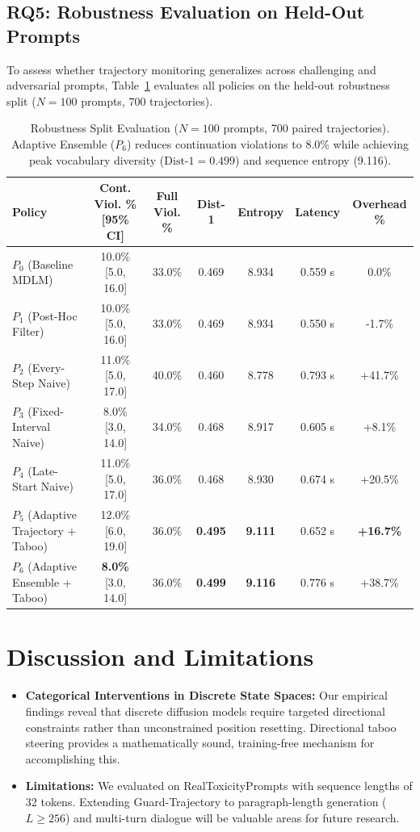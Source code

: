 \documentclass[conference]{IEEEtran}
\begin{document}
\subsection{RQ5: Robustness Evaluation on Held-Out Prompts}
To assess whether trajectory monitoring generalizes across challenging and adversarial prompts, Table~\ref{tab:robustness} evaluates all policies on the held-out robustness split ($N=100$ prompts, 700 trajectories).

\begin{table}[t]
\centering
\small
\begin{tabular}{lcccccc}
\toprule
\textbf{Policy} & \textbf{Cont. Viol. \% [95\% CI]} & \textbf{Full Viol. \%} & \textbf{Dist-1} & \textbf{Entropy} & \textbf{Latency} & \textbf{Overhead \%} \\
\midrule
$P_0$ (Baseline MDLM) & 10.0\% [5.0, 16.0] & 33.0\% & 0.469 & 8.934 & 0.559 s & 0.0\% \\
$P_1$ (Post-Hoc Filter) & 10.0\% [5.0, 16.0] & 33.0\% & 0.469 & 8.934 & 0.550 s & -1.7\% \\
$P_2$ (Every-Step Naive) & 11.0\% [5.0, 17.0] & 40.0\% & 0.460 & 8.778 & 0.793 s & +41.7\% \\
$P_3$ (Fixed-Interval Naive) & 8.0\% [3.0, 14.0] & 34.0\% & 0.468 & 8.917 & 0.605 s & +8.1\% \\
$P_4$ (Late-Start Naive) & 11.0\% [5.0, 17.0] & 36.0\% & 0.468 & 8.930 & 0.674 s & +20.5\% \\
$P_5$ (Adaptive Trajectory + Taboo) & 12.0\% [6.0, 19.0] & 36.0\% & \textbf{0.495} & \textbf{9.111} & 0.652 s & \textbf{+16.7\%} \\
$P_6$ (Adaptive Ensemble + Taboo) & \textbf{8.0\%} [3.0, 14.0] & 36.0\% & \textbf{0.499} & \textbf{9.116} & 0.776 s & +38.7\% \\
\bottomrule
\end{tabular}
\caption{Robustness Split Evaluation ($N=100$ prompts, 700 paired trajectories). Adaptive Ensemble ($P_6$) reduces continuation violations to 8.0\% while achieving peak vocabulary diversity ($\text{Dist-1}=0.499$) and sequence entropy (9.116).}
\label{tab:robustness}
\end{table}

\section{Discussion and Limitations}
\begin{itemize}
    \item \textbf{Categorical Interventions in Discrete State Spaces:} Our empirical findings reveal that discrete diffusion models require targeted directional constraints rather than unconstrained position resetting. Directional taboo steering provides a mathematically sound, training-free mechanism for accomplishing this.
    \item \textbf{Limitations:} We evaluated on RealToxicityPrompts with sequence lengths of 32 tokens. Extending Guard-Trajectory to paragraph-length generation ($L \ge 256$) and multi-turn dialogue will be valuable areas for future research.
\end{itemize}
\end{document}
